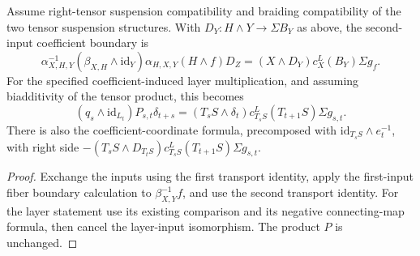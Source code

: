 \begin{proposition}
  \label{prop:h6-braided-right-boundary}
  \leanok
  Assume right-tensor suspension compatibility and braiding compatibility
  of the two tensor suspension structures. With $D_Y:H\wedge Y\to
  \Sigma B_Y$ as above, the second-input coefficient boundary is
  \[
    \alpha_{X,H,Y}^{-1}(\beta_{X,H}\wedge\mathrm{id}_Y)
       \alpha_{H,X,Y}(H\wedge f)D_Z
       =(X\wedge D_Y)c_X^L(B_Y)\Sigma g_f.
  \]
  For the specified coefficient-induced layer multiplication, and
  assuming biadditivity of the tensor product, this becomes
  \[
    (q_s\wedge\mathrm{id}_{L_t})P_{s,t}\delta_{t+s}
       =(T_sS\wedge\delta_t)c_{T_sS}^L(T_{t+1}S)\Sigma g_{s,t}.
  \]
  There is also the coefficient-coordinate formula, precomposed with
  $\mathrm{id}_{T_sS}\wedge e_t^{-1}$, with right side
  $-(T_sS\wedge D_{T_tS})c_{T_sS}^L(T_{t+1}S)\Sigma g_{s,t}$.
\end{proposition}
\begin{proof}
  Exchange the inputs using the first transport identity, apply the
  first-input fiber boundary calculation to $\beta_{X,Y}^{-1}f$, and
  use the second transport identity. For the layer statement use its
  existing comparison and its negative connecting-map formula, then
  cancel the layer-input isomorphism. The product $P$ is unchanged.
  \leanok
\end{proof}


